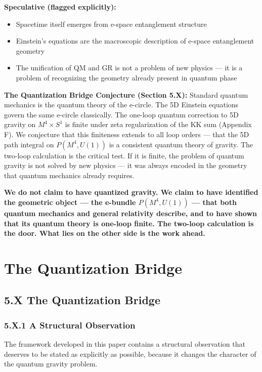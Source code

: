\documentclass[aps,prd,preprint,superscriptaddress,longbibliography,floatfix]{revtex4-2}
\theoremstyle{remark}
\begin{document}
\textbf{Speculative (flagged explicitly):}

\begin{itemize}
  \item Spacetime itself emerges from e-space entanglement structure
  \item Einstein's equations are the macroscopic description of e-space entanglement geometry
  \item The unification of QM and GR is not a problem of new physics --- it is a problem of recognizing the geometry already present in quantum phase
\end{itemize}

\textbf{The Quantization Bridge Conjecture (Section 5.X):} Standard quantum mechanics is the quantum theory of the e-circle. The 5D Einstein equations govern the same e-circle classically. The one-loop quantum correction to 5D gravity on $M^{4} \times S^{1}$ is finite under zeta regularization of the KK sum (Appendix F). We conjecture that this finiteness extends to all loop orders --- that the 5D path integral on $P(M^{4}, U(1))$ is a consistent quantum theory of gravity. The two-loop calculation is the critical test. If it is finite, the problem of quantum gravity is not solved by new physics --- it was always encoded in the geometry that quantum mechanics already requires.

\textbf{We do not claim to have quantized gravity. We claim to have identified the geometric object --- the e-bundle $P(M^{4}, U(1))$ --- that both quantum mechanics and general relativity describe, and to have shown that its quantum theory is one-loop finite. The two-loop calculation is the door. What lies on the other side is the work ahead.}


\section{The Quantization Bridge}



\subsection{5.X The Quantization Bridge}


\subsubsection{5.X.1 A Structural Observation}

The framework developed in this paper contains a structural observation that deserves to be stated as explicitly as possible, because it changes the character of the quantum gravity problem.
\end{document}
